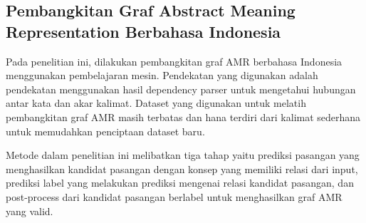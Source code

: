\subsection{Pembangkitan Graf Abstract Meaning Representation Berbahasa Indonesia }

Pada penelitian ini, dilakukan pembangkitan graf AMR berbahasa Indonesia menggunakan pembelajaran mesin.
Pendekatan yang digunakan adalah pendekatan menggunakan hasil dependency parser untuk mengetahui hubungan antar kata dan akar kalimat.
Dataset yang digunakan untuk melatih pembangkitan graf AMR masih terbatas dan hana terdiri dari kalimat sederhana untuk memudahkan penciptaan dataset baru.

Metode dalam penelitian ini melibatkan tiga tahap yaitu prediksi pasangan yang menghasilkan kandidat pasangan dengan konsep yang memiliki relasi dari input, prediksi label yang melakukan prediksi mengenai relasi kandidat pasangan, dan post-process dari kandidat pasangan berlabel untuk menghasilkan graf AMR yang valid.
